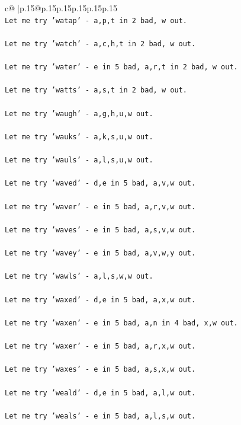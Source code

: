 \documentclass{article}
\begin{document}
{\begin{supertabular}{c@{$\;$}|p{.15\linewidth}@{}p{.15\linewidth}p{.15\linewidth}p{.15\linewidth}p{.15\linewidth}p{.15\linewidth}}
{{{\\ 
\texttt{Let me try 'watap' {-} a,p,t in 2 bad, w out. } \\
\\ 
\texttt{Let me try 'watch' {-} a,c,h,t in 2 bad, w out. } \\
\\ 
\texttt{Let me try 'water' {-} e in 5 bad, a,r,t in 2 bad, w out. } \\
\\ 
\texttt{Let me try 'watts' {-} a,s,t in 2 bad, w out. } \\
\\ 
\texttt{Let me try 'waugh' {-} a,g,h,u,w out. } \\
\\ 
\texttt{Let me try 'wauks' {-} a,k,s,u,w out. } \\
\\ 
\texttt{Let me try 'wauls' {-} a,l,s,u,w out. } \\
\\ 
\texttt{Let me try 'waved' {-} d,e in 5 bad, a,v,w out. } \\
\\ 
\texttt{Let me try 'waver' {-} e in 5 bad, a,r,v,w out. } \\
\\ 
\texttt{Let me try 'waves' {-} e in 5 bad, a,s,v,w out. } \\
\\ 
\texttt{Let me try 'wavey' {-} e in 5 bad, a,v,w,y out. } \\
\\ 
\texttt{Let me try 'wawls' {-} a,l,s,w,w out. } \\
\\ 
\texttt{Let me try 'waxed' {-} d,e in 5 bad, a,x,w out. } \\
\\ 
\texttt{Let me try 'waxen' {-} e in 5 bad, a,n in 4 bad, x,w out. } \\
\\ 
\texttt{Let me try 'waxer' {-} e in 5 bad, a,r,x,w out. } \\
\\ 
\texttt{Let me try 'waxes' {-} e in 5 bad, a,s,x,w out. } \\
\\ 
\texttt{Let me try 'weald' {-} d,e in 5 bad, a,l,w out. } \\
\\ 
\texttt{Let me try 'weals' {-} e in 5 bad, a,l,s,w out. } \\
\\ 
}}}
\end{supertabular}}
\end{document}
